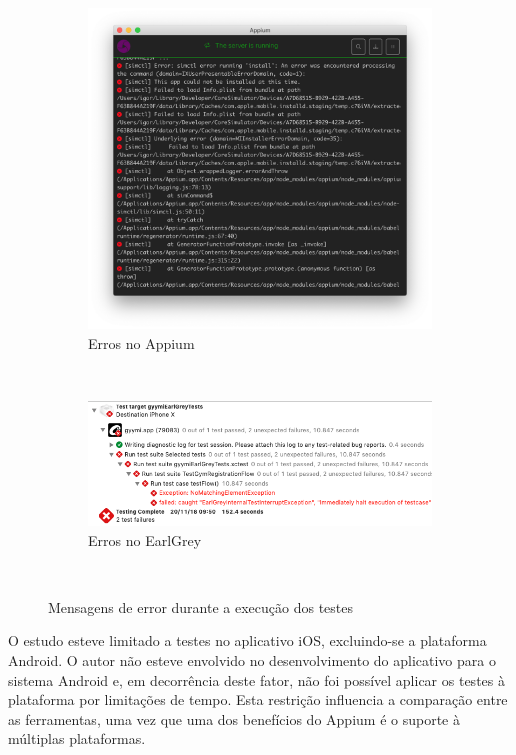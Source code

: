 \begin{figure}[H]
	\centering
    \begin{subfigure}[b]{0.4\textwidth}
        \includegraphics[width=\textwidth]{pfc/figuras/error-appium.png}
        \caption{Erros no Appium}
        \label{fig:error-appium}
    \end{subfigure}
    ~
	\begin{subfigure}[b]{0.4\textwidth}
        \includegraphics[width=\textwidth]{pfc/figuras/error-earlgrey.png}
        \caption{Erros no EarlGrey}
        \label{fig:error-earlgrey}
    \end{subfigure}
    ~
    \caption{Mensagens de error durante a execução dos testes}
    \label{fig:error-test-tools}
\end{figure}

O estudo esteve limitado a testes no aplicativo iOS, excluindo-se a plataforma Android. O autor não esteve envolvido no desenvolvimento do aplicativo para o sistema Android e, em decorrência deste fator, não foi possível aplicar os testes à plataforma por limitações de tempo. Esta restrição influencia a comparação entre as ferramentas, uma vez que uma dos benefícios do Appium é o suporte à múltiplas plataformas.
